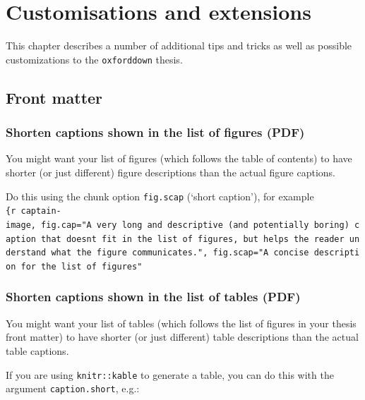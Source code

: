\documentclass[a4paper, twoside]{templates/ociamthesis}
\theoremstyle{definition}
\theoremstyle{definition}
\theoremstyle{definition}
\theoremstyle{definition}
\theoremstyle{remark}
\begin{document}
\hypertarget{customisations-and-extensions}{%
\chapter{Customisations and extensions}\label{customisations-and-extensions}}

\minitoc 

\noindent This chapter describes a number of additional tips and tricks as well as possible customizations to the \texttt{oxforddown} thesis.

\hypertarget{front-matter}{%
\section{Front matter}\label{front-matter}}

\hypertarget{shorten-captions-shown-in-the-list-of-figures-pdf}{%
\subsection{Shorten captions shown in the list of figures (PDF)}\label{shorten-captions-shown-in-the-list-of-figures-pdf}}

You might want your list of figures (which follows the table of contents) to have shorter (or just different) figure descriptions than the actual figure captions.

Do this using the chunk option \texttt{fig.scap} (`short caption'), for example \texttt{\{r\ captain-image,\ fig.cap="A\ very\ long\ and\ descriptive\ (and\ potentially\ boring)\ caption\ that\ doesn\textquotesingle{}t\ fit\ in\ the\ list\ of\ figures,\ but\ helps\ the\ reader\ understand\ what\ the\ figure\ communicates.",\ fig.scap="A\ concise\ description\ for\ the\ list\ of\ figures"}

\hypertarget{shorten-captions-shown-in-the-list-of-tables-pdf}{%
\subsection{Shorten captions shown in the list of tables (PDF)}\label{shorten-captions-shown-in-the-list-of-tables-pdf}}

You might want your list of tables (which follows the list of figures in your thesis front matter) to have shorter (or just different) table descriptions than the actual table captions.

If you are using \texttt{knitr::kable} to generate a table, you can do this with the argument \texttt{caption.short}, e.g.:
\end{document}
